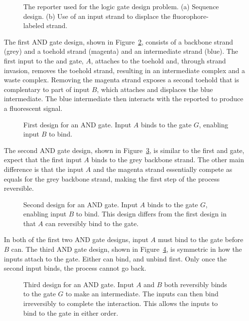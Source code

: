 \begin{figure}
  \caption{\label{fig:reporter} The reporter used for the logic gate
    design problem. (a) Sequence design. (b) Use of an input strand to
    displace the fluorophore-labeled strand. }
\end{figure}

The first AND gate design, shown in Figure~\ref{fig:and1}, consists of a
backbone strand (grey) and a toehold strand (magenta) and an
intermediate strand (blue). The first input to the and gate, $A$,
attaches to the toehold and, through strand invasion, removes the
toehold strand, resulting in an intermediate complex and a waste
complex. Removing the magenta strand exposes a second toehold that is
complentary to part of input $B$, which attaches and displaces the
blue intermediate. The blue intermediate then interacts with the
reported to produce a fluorescent signal.

\begin{figure}
  \caption{\label{fig:and1} First design for an AND gate. Input $A$ binds to the gate
    $G$, enabling input $B$ to bind.}
\end{figure}

The second AND gate design, shown in Figure~\ref{fig:and2}, is similar to the
first and gate, expect that the first input $A$ binds to the grey
backbone strand. The other main difference is that the input $A$ and
the magenta strand essentially compete as equals for the grey backbone
strand, making the first step of the process reversible. 

\begin{figure}
  \caption{\label{fig:and2}Second design for an AND gate. Input $A$ binds to the gate
    $G$, enabling input $B$ to bind. This design differs from the
    first design in that $A$ can reversibly bind to the gate.}
\end{figure}

In both of the first two AND gate designs, input $A$ must bind to the
gate before $B$ can. The third AND gate design, shown in
Figure~\ref{fig:and3}, is symmetric in how the inputs attach to the
gate. Either can bind, and unbind first. Only once the second input
binds, the process cannot go back.

\begin{figure}
  \caption{\label{fig:and3}Third design for an AND gate. Input $A$ and $B$ both
    reversibly binds to the gate $G$ to make an intermediate. The
    inputs can then bind irreversibly to complete the
    interaction. This allows the inputs to bind to the gate in either
    order.}
\end{figure}

